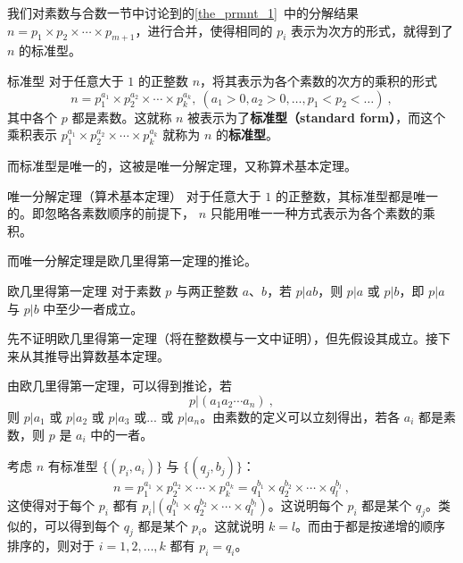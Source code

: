 
我们对素数与合数一节中讨论到的\autoref{the_prmnt_1}~中的分解结果 $n = p_1 \times p_2\times \cdots \times p_{m+1}$，进行合并，使得相同的 $p_i$ 表示为次方的形式，就得到了 $n$ 的标准型。
\begin{definition}{标准型}
对于任意大于 $1$ 的正整数 $n$，将其表示为各个素数的次方的乘积的形式
\begin{equation}
n = p_1^{a_1} \times p_2^{a_2} \times \cdots \times p_k^{a_k}, ~ (a_1 > 0, a_2 > 0 , \dots, p_1 < p_2<\dots) ~,
\end{equation}
其中各个 $p$ 都是素数。这就称 $n$ 被表示为了\textbf{标准型（standard form）}，而这个乘积表示 $p_1^{a_1} \times p_2^{a_2} \times \cdots \times p_k^{a_k}$ 就称为 $n$ 的\textbf{标准型}。
\end{definition}

而标准型是唯一的，这被是唯一分解定理，又称算术基本定理。
\begin{theorem}{唯一分解定理（算术基本定理）}
对于任意大于 $1$ 的正整数，其标准型都是唯一的。即忽略各素数顺序的前提下， $n$ 只能用唯一一种方式表示为各个素数的乘积。
\end{theorem}

而唯一分解定理是欧几里得第一定理的推论。
\begin{theorem}{欧几里得第一定理}\label{the_stafnt_1}
对于素数 $p$ 与两正整数 $a$、$b$，若 $p|ab$，则 $p|a$ 或 $p|b$，即 $p|a$ 与 $p|b$ 中至少一者成立。
\end{theorem}

先不证明欧几里得第一定理（将在整数模与一文中证明），但先假设其成立。接下来从其推导出算数基本定理。

由欧几里得第一定理，可以得到推论，若
\begin{equation}
p | (a_1 a_2 \cdots a_n) ~,
\end{equation}
则 $p | a_1$ 或 $p | a_2$ 或 $p|a_3$ 或... 或 $p|a_n$。由素数的定义可以立刻得出，若各 $a_i$ 都是素数，则 $p$ 是 $a_i$ 中的一者。

考虑 $n$ 有标准型 $\{(p_i, a_i)\}$ 与  $\{(q_j, b_j)\}$：
\begin{equation}
n = p_1^{a_1}\times p_2^{a_2} \times \cdots \times p_k^{a_k} = q_1^{b_1} \times q_2^{b_2} \times \cdots \times q_l^{b_l} ~,
\end{equation}
这使得对于每个 $p_i$ 都有 $p_i | (q_1^{b_1} \times q_2^{b_2} \times \cdots \times q_l^{b_l})$。这说明每个 $p_i$ 都是某个 $q_j$。类似的，可以得到每个 $q_j$ 都是某个 $p_i$。这就说明 $k = l$。而由于都是按递增的顺序排序的，则对于 $i = 1,2,\dots, k$ 都有 $p_i = q_i$。


